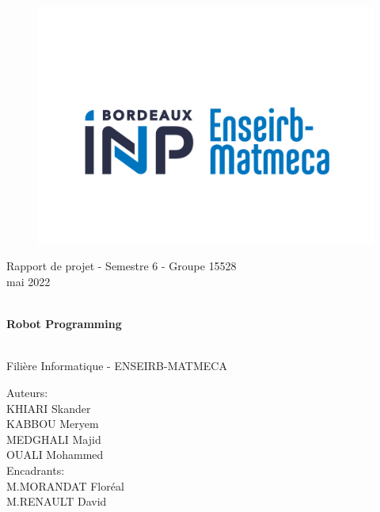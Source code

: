 \documentclass[11pt]{article}
\begin{document}
\begin{figure}[h]
    \centering
    \includegraphics[scale=0.55]{Logo_ENSEIRB-MATMECA-Bordeaux_INP.svg.png}
\end{figure}
\begin{center}
    

\Large Rapport de projet - Semestre 6 - Groupe 15528 \\
\vspace{0.5cm}
mai 2022
\vspace{2cm}
\begin{figure}[h]
\end{figure}\\
\vspace{1cm}
\textbf{\Huge Robot Programming}
\vspace{1cm}
\begin{figure}[h]
\end{figure}\\
\vspace{0.5cm}
Filière Informatique - ENSEIRB-MATMECA
\end{center}
\begin{flushleft}
Auteurs:\\
KHIARI Skander\\
KABBOU Meryem\\
MEDGHALI Majid \\
OUALI Mohammed \\
\vspace{0.5cm}
Encadrants:\\
M.MORANDAT Floréal\\
M.RENAULT David\\
\end{flushleft}
\end{document}
